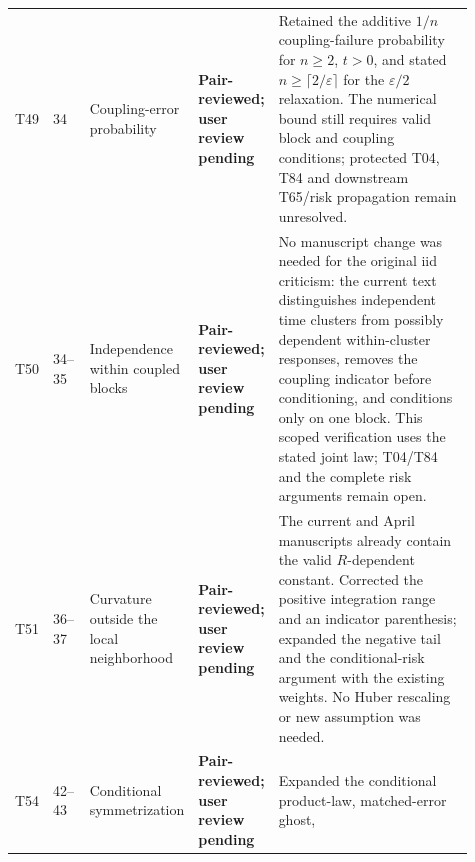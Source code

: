 \documentclass[10pt]{article}
\newcommand{\deferred}{\textcolor{deferredred}{\textbf{Deferred}}}
\newcommand{\pairreviewed}{\textcolor{deferredred}{\textbf{Pair-reviewed; user review pending}}}
\begin{document}
\begin{landscape}
\begin{longtable}{L{0.045\linewidth}L{0.08\linewidth}L{0.21\linewidth}L{0.13\linewidth}L{0.445\linewidth}}
T49 & 34 & Coupling-error probability & \pairreviewed &
\textcolor{deferredred}{Retained the additive $1/n$ coupling-failure probability
for $n\ge2$, $t>0$, and stated $n\ge\lceil2/\varepsilon\rceil$ for the
$\varepsilon/2$ relaxation. The numerical bound still requires valid block and
coupling conditions; protected T04, T84 and downstream T65/risk propagation
remain unresolved.}\\
T50 & 34--35 & Independence within coupled blocks & \pairreviewed &
\textcolor{deferredred}{No manuscript change was needed for the original iid
criticism: the current text distinguishes independent time clusters from
possibly dependent within-cluster responses, removes the coupling indicator
before conditioning, and conditions only on one block. This scoped verification
uses the stated joint law; T04/T84 and the complete risk arguments remain open.}\\
T51 & 36--37 & Curvature outside the local neighborhood & \pairreviewed &
\textcolor{deferredred}{The current and April manuscripts already contain the valid
$R$-dependent constant. Corrected the positive integration range and an indicator
parenthesis; expanded the negative tail and the conditional-risk argument with
the existing weights. No Huber rescaling or new assumption was needed.}\\
T54 & 42--43 & Conditional symmetrization & \pairreviewed &
\textcolor{deferredred}{Expanded the conditional product-law, matched-error ghost,
}
\end{longtable}
\end{landscape}
\end{document}
